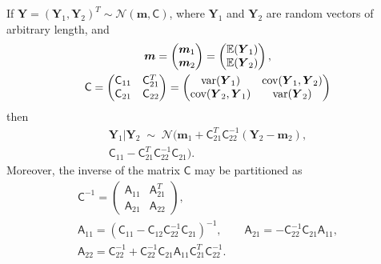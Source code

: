 \documentclass[twocolumn]{svjour3}          %
\newcommand{\bm}[1]{\boldsymbol{#1}}
\newcommand{\Ex}{\mathbb{E}}
\newcommand{\vm}{\bm{m}}
\newcommand{\vY}{\bm{Y}}
\newcommand{\mA}{\mathsf{A}}
\newcommand{\mC}{\mathsf{C}}
\newcommand{\cov}{{\textup{cov}}}
\newcommand{\var}{{\textup{var}}}
\newcommand{\calN}{\mathcal{N}}
\begin{document}
\begin{lemma} \cite[(A.6), (A.11--13)]{RasWil06a} \label{thrm:condDist} If $\vY = (\vY_1, \vY_2)^T \sim \calN (\vm,\mC)$, where $\vY_1$ and $\vY_2$ are random vectors of arbitrary length, and 
	\begin{gather*}
	\vm = \begin{pmatrix} \vm_1 \\ \vm_2 \end{pmatrix} = \begin{pmatrix} \Ex(\vY_1) \\ \Ex(\vY_2) \end{pmatrix}, \\
	\mC = \begin{pmatrix}
	\mC_{11} & \mC_{21}^T \\ 	\mC_{21} & \mC_{22}
	\end{pmatrix} =
	\begin{pmatrix}
	\var(\vY_{1}) & \cov(\vY_{1}, \vY_2) \\ 	\cov(\vY_2,\vY_{1}) & \var(\vY_{2})
	\end{pmatrix} 
	\end{gather*}
	then 
	\begin{multline*}
	\vY_1 \vert \vY_2 \; \sim \; \calN \bigl(\vm_1 + \mC_{21}^T \mC_{22}^{-1}(\vY_2 - \vm_2), \\ \mC_{11} - \mC_{21}^T \mC_{22}^{-1} \mC_{21} \bigr).
	\end{multline*}
Moreover, the inverse of the matrix $\mC$ may be partitioned as
\begin{gather*}
\mC^{-1} = \begin{pmatrix} \mA_{11} & \mA_{21}^T \\ \mA_{21} & \mA_{22} \end{pmatrix}, \\
\mA_{11} = (\mC_{11} - \mC_{12} \mC_{22}^{-1} \mC_{21})^{-1}, \qquad 
\mA_{21} = -  \mC_{22}^{-1} \mC_{21} \mA_{11}, \\ 
\mA_{22} = \mC_{22}^{-1} + \mC_{22}^{-1} \mC_{21} \mA_{11} \mC_{21}^T \mC_{22}^{-1}.
\end{gather*}

\end{lemma}
\end{document}

